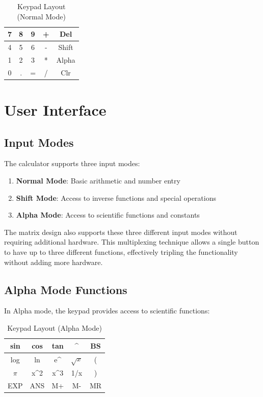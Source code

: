 \documentclass[12pt,a4paper]{article}
\begin{document}
\begin{table}[h]
\centering
\begin{tabular}{|c|c|c|c|c|}
\hline
7 & 8 & 9 & + & Del \\
\hline
4 & 5 & 6 & - & Shift \\
\hline
1 & 2 & 3 & * & Alpha \\
\hline
0 & . & = & / & Clr \\
\hline
\end{tabular}
\caption{Keypad Layout (Normal Mode)}
\end{table}

\section{User Interface}

\subsection{Input Modes}
The calculator supports three input modes:

\begin{enumerate}
    \item \textbf{Normal Mode}: Basic arithmetic and number entry
    \item \textbf{Shift Mode}: Access to inverse functions and special operations
    \item \textbf{Alpha Mode}: Access to scientific functions and constants
\end{enumerate}

The matrix design also supports these three different input modes without requiring additional hardware. This multiplexing technique allows a single button to have up to three different functions, effectively tripling the functionality without adding more hardware.

\subsection{Alpha Mode Functions}
In Alpha mode, the keypad provides access to scientific functions:

\begin{table}[h]
\centering
\begin{tabular}{|c|c|c|c|c|}
\hline
sin & cos & tan & \textasciicircum & BS \\
\hline
log & ln & e\textasciicircum & $\sqrt{x}$ & ( \\
\hline
$\pi$ & x^2 & x^3 & 1/x & ) \\

\hline
EXP & ANS & M+ & M- & MR \\
\hline
\end{tabular}
\caption{Keypad Layout (Alpha Mode)}
\end{table}
\end{document}
